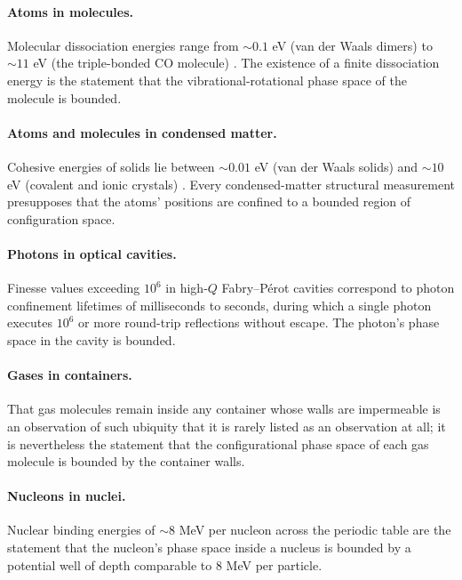 \paragraph{Atoms in molecules.} Molecular dissociation energies range from $\sim 0.1$ eV (van der Waals dimers) to $\sim 11$ eV (the triple-bonded CO molecule) \citep{wilsondeciuscross1955}. The existence of a finite dissociation energy is the statement that the vibrational-rotational phase space of the molecule is bounded.

\paragraph{Atoms and molecules in condensed matter.} Cohesive energies of solids lie between $\sim 0.01$ eV (van der Waals solids) and $\sim 10$ eV (covalent and ionic crystals) \citep{ashcroftmermin1976}. Every condensed-matter structural measurement presupposes that the atoms' positions are confined to a bounded region of configuration space.

\paragraph{Photons in optical cavities.} Finesse values exceeding $10^{6}$ in high-$Q$ Fabry--P\'erot cavities correspond to photon confinement lifetimes of milliseconds to seconds, during which a single photon executes $10^{6}$ or more round-trip reflections without escape. The photon's phase space in the cavity is bounded.

\paragraph{Gases in containers.} That gas molecules remain inside any container whose walls are impermeable is an observation of such ubiquity that it is rarely listed as an observation at all; it is nevertheless the statement that the configurational phase space of each gas molecule is bounded by the container walls.

\paragraph{Nucleons in nuclei.} Nuclear binding energies of $\sim 8$ MeV per nucleon across the periodic table \citep{audi2017,krane1988} are the statement that the nucleon's phase space inside a nucleus is bounded by a potential well of depth comparable to $8$ MeV per particle.

